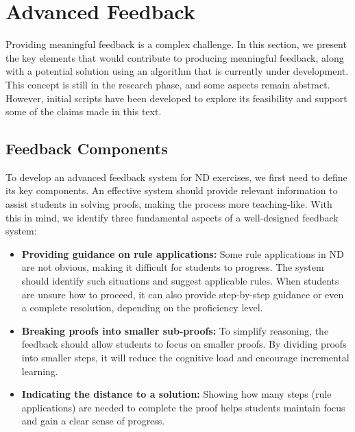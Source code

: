 %

\chapter{Advanced Feedback}
\label{tab:ad_algo}

Providing meaningful feedback is a complex challenge. In this section, we present the key elements that would contribute to producing meaningful feedback, along with a potential solution using an algorithm that is currently under development. This concept is still in the research phase, and some aspects remain abstract. However, initial scripts have been developed to explore its feasibility and support some of the claims made in this text. 

\section{Feedback Components}
To develop an advanced feedback system for \gls{ND} exercises, we first need to define its key components. An effective system should provide relevant information to assist students in solving proofs, making the process more teaching-like. With this in mind, we identify three fundamental aspects of a well-designed feedback system:

\begin{itemize}
    \item \textbf{Providing guidance on rule applications:} Some rule applications in \gls{ND} are not obvious, making it difficult for students to progress. The system should identify such situations and suggest applicable rules. When students are unsure how to proceed, it can also provide step-by-step guidance or even a complete resolution, depending on the proficiency level.
    
    \item \textbf{Breaking proofs into smaller sub-proofs:} To simplify reasoning, the feedback should allow students to focus on smaller proofs. By dividing proofs into smaller steps, it will reduce the cognitive load and encourage incremental learning.
    
    \item \textbf{Indicating the distance to a solution:} Showing how many steps (rule applications) are needed to complete the proof helps students maintain focus and gain a clear sense of progress.
\end{itemize}

